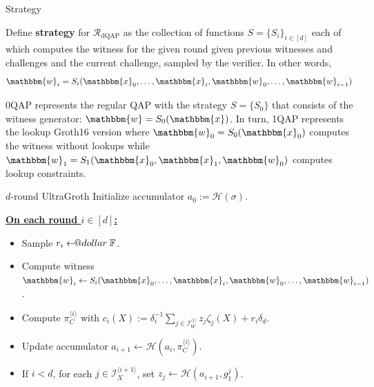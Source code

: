 \documentclass{zkdl-presentation-template}
\makeatletter
\newcommand\leftarrowS{\leftarrow\joinrel\smalldollar}
\newcommand{\smalldollar}{\mathrel{\mathpalette\small@dollar\relax}}
\newcommand{\small@dollar}[2]{%
  \vcenter{\hbox{%
    $#1\textnormal{\fontsize{0.7\dimexpr\f@size pt}{0}\selectfont\$}$%
  }}%
}
\makeatother
\begin{document}
    \begin{frame}{Strategy}
        \begin{definition}[Strategy]
            Define \textbf{strategy} for $\mathcal{R}_{\text{dQAP}}$ as the
            collection of functions $S=\{S_i\}_{i \in [d]}$ each of which
            computes the witness for the given round given previous witnesses
            and challenges and the current challenge, sampled by the verifier.
            In other words,
            \begin{equation*}
                \mathbbm{w}_i = S_i(\mathbbm{x}_0,\dots,\mathbbm{x}_i,\mathbbm{w}_0,\dots,\mathbbm{w}_{i-1})
            \end{equation*}
        \end{definition}

        \pause\begin{example}
            0QAP represents the regular QAP with the strategy $S = \{S_0\}$ that
            consists of the witness generator: $\mathbbm{w} = S_0(\mathbbm{x})$.\pause
            In turn, 1QAP represents the lookup Groth16 version where
            $\mathbbm{w}_0=S_0(\mathbbm{x}_0)$ computes the witness without
            lookups while
            $\mathbbm{w}_1=S_1(\mathbbm{x}_0,\mathbbm{x}_1,\mathbbm{w}_0)$
            computes lookup constraints.
        \end{example}
    \end{frame}

    \begin{frame}{$d$-round UltraGroth}
        Initialize accumulator $a_0 := \mathcal{H}(\sigma)$.\pause

        \underline{\textbf{On each round $i \in [d]$:}}
        \begin{itemize}
            \item Sample $r_i \leftarrowS \mathbb{F}$.\pause
            \item Compute witness $\mathbbm{w}_i \gets S_i(\mathbbm{x}_0,\dots,\mathbbm{x}_i,\mathbbm{w}_0,\dots,\mathbbm{w}_{i-1})$.\pause
            \item Compute $\pi_C^{\langle i \rangle}$ with $c_i(X) :=
            \delta_i^{-1}\sum_{j \in \mathcal{I}_W^{\langle i \rangle}}
            z_j\zeta_j(X) + r_i\delta_d$.\pause
            \item Update accumulator $a_{i+1} \gets \mathcal{H}(a_i, \pi_C^{\langle i \rangle})$.\pause
            \item If $i<d$, for each $j \in \mathcal{I}_X^{\langle i+1 \rangle}$,
            set $z_j \gets \mathcal{H}(a_{i+1},g_1^j)$.
        \end{itemize}
    \end{frame}
\end{document}
